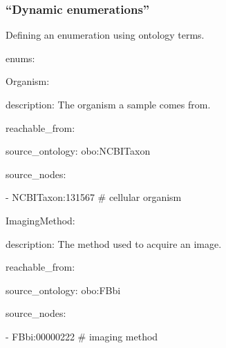 \begin{frame}
  \frametitle{``Dynamic enumerations''}

  Defining an enumeration using ontology terms.

\begin{semiverbatim}
enums:

\hspace{1em}Organism:

\hspace{2em}description: The organism a sample comes from.

\hspace{2em}reachable\_from:

\hspace{3em}source\_ontology: obo:NCBITaxon

\hspace{3em}source\_nodes:

\hspace{4em}- NCBITaxon:131567 \# cellular organism

\medskip
\hspace{1em}ImagingMethod:

\hspace{2em}description: The method used to acquire an image.

\hspace{2em}reachable\_from:

\hspace{3em}source\_ontology: obo:FBbi

\hspace{3em}source\_nodes:

\hspace{4em}- FBbi:00000222 \# imaging method
\end{semiverbatim}
\end{frame}

